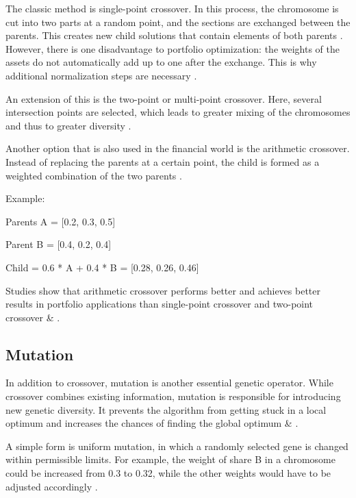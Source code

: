 \documentclass{agasthesis}
\begin{document}
The classic method is single-point crossover. In this process, the chromosome is cut into two parts at a random point, and the sections are exchanged between 
the parents. This creates new child solutions that contain elements of both parents \cite[p. 8-9]{melanie_introduction_1999}. However, there is one disadvantage to portfolio 
optimization: the weights of the assets do not automatically add up to one after the exchange. This is why additional normalization steps are necessary \cite[p. 1750]{fu_adopting_2013}.

An extension of this is the two-point or multi-point crossover. Here, several intersection points are selected, which leads to greater mixing of the chromosomes 
and thus to greater diversity \cite[p. 57]{melanie_introduction_1999}. 

Another option that is also used in the financial world is the arithmetic crossover. Instead of replacing the parents at a certain point, 
the child is formed as a weighted combination of the two parents \cite[p. 10]{filograsso_adaptive_2023}.

Example:

Parents A = [0.2, 0.3, 0.5]

Parent B = [0.4, 0.2, 0.4]

Child = 0.6 * A + 0.4 * B = [0.28, 0.26, 0.46]

Studies show that arithmetic crossover performs better and achieves better results in portfolio applications 
than single-point crossover and two-point crossover \cite[p. 71]{dubinskas_investment_2017} \& \cite[p. 152]{sefiane_portfolio_2012}.

\subsection{Mutation}
In addition to crossover, mutation is another essential genetic operator. While crossover combines existing information, 
mutation is responsible for introducing new genetic diversity. It prevents the algorithm from getting stuck in a local optimum 
and increases the chances of finding the global optimum \cite[p. 129-130]{melanie_introduction_1999} \& \cite[p. 471]{kalayci_review_2017}.

A simple form is uniform mutation, in which a randomly selected gene is changed within permissible limits. For example, 
the weight of share B in a chromosome could be increased from 0.3 to 0.32, while the other weights would have to be adjusted 
accordingly \cite[p. 18]{brzek_exploration-driven_2025}.
\end{document}
